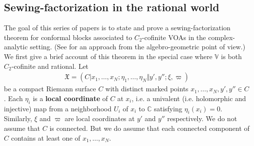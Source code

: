 \documentclass[11pt,b5paper,notitlepage]{article}
\theoremstyle{definition}
\theoremstyle{plain}
\newcommand{\Vbb}{\mathbb V}
\newcommand{\Cbb}{\mathbb C}
\newcommand{\Pbb}{\mathbb P}
\newcommand{\<}{\left\langle}
\renewcommand{\>}{\right\rangle}
\newcommand{\fx}{\mathfrak{X}}
\numberwithin{equation}{section}
\begin{document}

\subsection{Sewing-factorization in the rational world}\label{lb84}


The goal of this series of papers is to state and prove a sewing-factorization theorem for conformal blocks associated to $C_2$-cofinite VOAs in the complex-analytic setting. (See \cite{DGK-presentations,DGK2} for an approach from the algebro-geometric point of view.) We first give a brief account of this theorem in the special case where $\Vbb$ is both $C_2$-cofinite and rational. Let
\begin{align}
\fx=(C|x_1,\dots,x_N;\eta_1,\dots,\eta_N\Vert y',y'';\xi,\varpi)
\end{align}
be a compact Riemann surface $C$ with distinct marked points $x_1,\dots,x_N,y',y''\in C$. Each $\eta_i$ is a \textbf{local coordinate} of $C$ at $x_i$, i.e. a univalent (i.e. holomorphic and injective) map from a neighborhood $U_i$ of $x_i$ to $\Cbb$ satisfying $\eta_i(x_i)=0$. Similarly, $\xi$ and $\varpi$ are local coordinates at $y'$ and $y''$ respectively. We do not assume that $C$ is connected. But we do assume that each connected component of $C$ contains at least one of $x_1,\dots,x_N$. 
\end{document}
